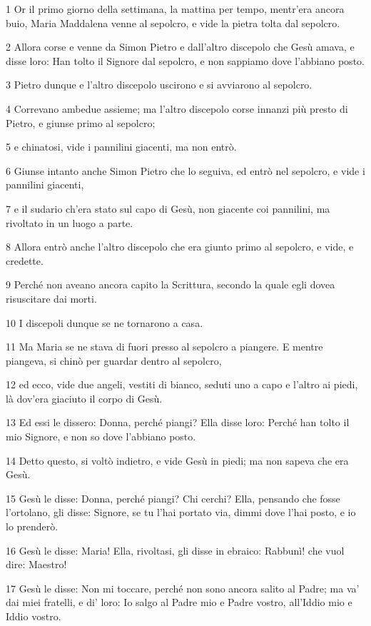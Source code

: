 \par 1 Or il primo giorno della settimana, la mattina per tempo, mentr'era ancora buio, Maria Maddalena venne al sepolcro, e vide la pietra tolta dal sepolcro.
\par 2 Allora corse e venne da Simon Pietro e dall'altro discepolo che Gesù amava, e disse loro: Han tolto il Signore dal sepolcro, e non sappiamo dove l'abbiano posto.
\par 3 Pietro dunque e l'altro discepolo uscirono e si avviarono al sepolcro.
\par 4 Correvano ambedue assieme; ma l'altro discepolo corse innanzi più presto di Pietro, e giunse primo al sepolcro;
\par 5 e chinatosi, vide i pannilini giacenti, ma non entrò.
\par 6 Giunse intanto anche Simon Pietro che lo seguiva, ed entrò nel sepolcro, e vide i pannilini giacenti,
\par 7 e il sudario ch'era stato sul capo di Gesù, non giacente coi pannilini, ma rivoltato in un luogo a parte.
\par 8 Allora entrò anche l'altro discepolo che era giunto primo al sepolcro, e vide, e credette.
\par 9 Perché non aveano ancora capito la Scrittura, secondo la quale egli dovea risuscitare dai morti.
\par 10 I discepoli dunque se ne tornarono a casa.
\par 11 Ma Maria se ne stava di fuori presso al sepolcro a piangere. E mentre piangeva, si chinò per guardar dentro al sepolcro,
\par 12 ed ecco, vide due angeli, vestiti di bianco, seduti uno a capo e l'altro ai piedi, là dov'era giaciuto il corpo di Gesù.
\par 13 Ed essi le dissero: Donna, perché piangi? Ella disse loro: Perché han tolto il mio Signore, e non so dove l'abbiano posto.
\par 14 Detto questo, si voltò indietro, e vide Gesù in piedi; ma non sapeva che era Gesù.
\par 15 Gesù le disse: Donna, perché piangi? Chi cerchi? Ella, pensando che fosse l'ortolano, gli disse: Signore, se tu l'hai portato via, dimmi dove l'hai posto, e io lo prenderò.
\par 16 Gesù le disse: Maria! Ella, rivoltasi, gli disse in ebraico: Rabbunì! che vuol dire: Maestro!
\par 17 Gesù le disse: Non mi toccare, perché non sono ancora salito al Padre; ma va' dai miei fratelli, e di' loro: Io salgo al Padre mio e Padre vostro, all'Iddio mio e Iddio vostro.
